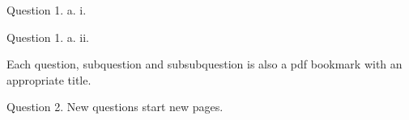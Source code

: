 \documentclass{ou-tma}
\begin{document}
\titlepage

\question  	%
\subquestion	%
\subsubquestion	%

Question 1. a. i.

\subsubquestion	%

Question 1. a. ii.

\subquestion	%

Each question, subquestion and subsubquestion is also a pdf bookmark with an appropriate title.

\question		%

Question 2. New questions start new pages.
\end{document}
